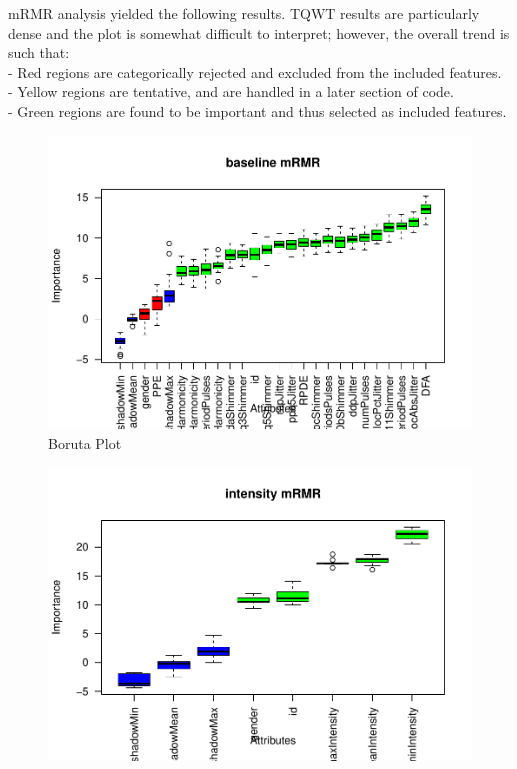 \documentclass[
]{article}
\begin{document}
mRMR analysis yielded the following results. TQWT results are particularly dense and the plot is somewhat difficult to interpret; however, the overall trend is such that:\\
- Red regions are categorically rejected and excluded from the included features.\\
- Yellow regions are tentative, and are handled in a later section of code.\\
- Green regions are found to be important and thus selected as included features.

\begin{landscape}

\begin{figure}

{\centering \includegraphics[width=1\linewidth,height=1\textheight]{figure/borutaPlot-1} 

}

\caption{\label{fig:borutaPlot}Boruta Plot}\label{fig:borutaPlot-1}
\end{figure}
\begin{figure}

{\centering \includegraphics[width=1\linewidth,height=1\textheight]{figure/borutaPlot-2} 

}
\end{figure}
\end{landscape}
\end{document}
